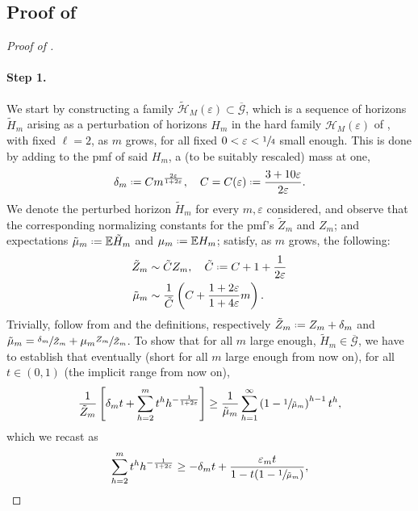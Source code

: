 \documentclass[11pt, a4paper, twoside]{article}
\newcommand*{\defeq}{\mathrel{\vcenter{\baselineskip0.5ex \lineskiplimit0pt
			\hbox{\scriptsize.}\hbox{\scriptsize.}}}=}
\newcommand{\eps}{\varepsilon}
\newcommand{\EE}{\mathbb{E}}
\newcommand{\PGFd}{\overline{\mathcal{G}}}
\numberwithin{equation}{section}
\begin{document}
	\subsection{Proof of }\label{supphardsecretaryGdhorizon}
	\begin{proof}[Proof of ]
		~\paragraph{Step 1.} We start by constructing a family $\tilde{\mathcal{H}}_M(\eps)\subset\PGFd$, which is a sequence of horizons $\tilde{H}_m$ arising as a perturbation of horizons $H_m$ in the hard family $\mathcal{H}_M(\eps)$ of , with fixed $\ell=2$, as $m$ grows, for all fixed $0<\eps<\sfrac{1}{4}$ small enough. This is done by adding to the pmf of said $H_m$, a (to be suitably rescaled) mass at one, 
		\begin{equation}\label{mass}
			\delta_m\defeq Cm^{\frac{2\eps}{1+2\eps}},\quad C=C(\eps)\defeq\frac{3+10\eps}{2\eps}.
		\end{equation} 
		We denote the perturbed horizon $\tilde{H}_m$ for every $m,\eps$ considered, and observe that the corresponding normalizing constants for the pmf's $\tilde{Z}_m$ and $Z_m$; and expectations $\tilde{\mu}_m\defeq\EE\tilde{H}_m$ and $\mu_m\defeq\EE H_m$; satisfy, as $m$ grows, the following:
		\begin{align}
			\tilde{Z}_m&\sim \tilde{C}Z_m,\quad \tilde{C}\defeq C+1+\frac{1}{2\eps}\label{Zratio}\\ 
			\tilde{\mu}_m&\sim\frac{1}{\tilde{C}}\left(C+\frac{1+2\eps}{1+4\eps}m\right).\label{muratio}
		\end{align} 
		Trivially,  follow from  and the definitions, respectively $\tilde{Z}_m\defeq Z_m+\delta_m$ and $\tilde{\mu}_m = \sfrac{\delta_m}{\tilde{Z}_m}+\mu_m\sfrac{Z_m}{\tilde{Z}_m}$.
		To show that for all $m$ large enough, $\tilde{H}_m\in\PGFd$, we have to establish that eventually (short for all $m$ large enough from now on), for all $t\in(0,1)$ (the implicit range from now on),
		\[\frac{1}{\tilde{Z}_m}\left[\delta_mt+\sum_{h=2}^m t^h h^{-\frac{1}{1+2\eps}}\right]\ge\frac{1}{\tilde{\mu}_m}\sum_{h=1}^\infty\left(1-\sfrac{1}{\tilde{\mu}_m}\right)^{h-1}t^h,\]
		which we recast as
		\begin{equation}\label{target}
			\sum_{h=2}^m t^h h^{-\frac{1}{1+2\eps}}\ge -\delta_mt+\frac{\eps_mt}{1-t(1-\sfrac{1}{\tilde{\mu}_m})},
		\end{equation}

\end{proof}
\end{document}
